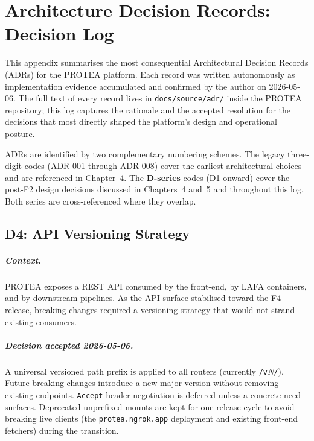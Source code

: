 \chapter{Architecture Decision Records: Decision Log}
\label{app:adr-log}

This appendix summarises the most consequential Architectural Decision Records
(ADRs) for the PROTEA platform. Each record was written autonomously as
implementation evidence accumulated and confirmed by the author on 2026-05-06.
The full text of every record lives in \texttt{docs/source/adr/} inside the
PROTEA repository; this log captures the rationale and the accepted resolution
for the decisions that most directly shaped the platform's design and
operational posture.

ADRs are identified by two complementary numbering schemes. The legacy
three-digit codes (ADR-001 through ADR-008) cover the earliest architectural
choices and are referenced in Chapter~4. The \textbf{D-series} codes (D1
onward) cover the post-F2 design decisions discussed in Chapters~4 and~5 and
throughout this log. Both series are cross-referenced where they overlap.

\section{D4: API Versioning Strategy}
\label{app:adr-d4}

\paragraph{Context.}
PROTEA exposes a REST API consumed by the front-end, by LAFA containers, and
by downstream pipelines. As the API surface stabilised toward the F4 release,
breaking changes required a versioning strategy that would not strand existing
consumers.

\paragraph{Decision accepted 2026-05-06.}
A universal versioned path prefix is applied to all routers (currently
\texttt{/v}\emph{N}\texttt{/}). Future breaking changes introduce a new major
version without removing existing endpoints. \texttt{Accept}-header negotiation
is deferred unless a concrete need surfaces. Deprecated unprefixed mounts are
kept for one release cycle to avoid breaking live clients (the
\texttt{protea.ngrok.app} deployment and existing front-end fetchers) during
the transition.

